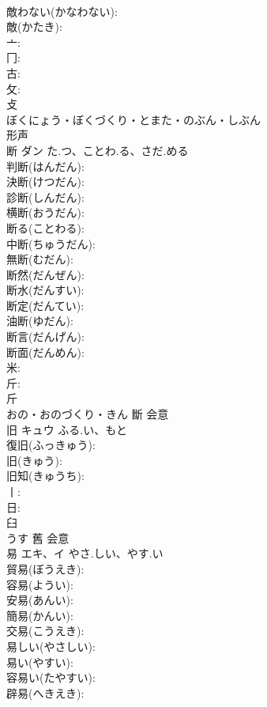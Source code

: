 \documentclass[8pt]{extreport}
\begin{document}
\begin{CJK}{UTF8}{min}
\\	敵わない(かなわない): 
\\	敵(かたき): 
\\	亠: 
\\	冂: 
\\	古: 
\\	攵: 
\\	攴	
\\	ぼくにょう・ぼくづくり・とまた・のぶん・しぶん	
\\	形声 
\\	断	ダン	た.つ、ことわ.る、さだ.める		
\\	判断(はんだん): 
\\	決断(けつだん): 
\\	診断(しんだん): 
\\	横断(おうだん): 
\\	断る(ことわる): 
\\	中断(ちゅうだん): 
\\	無断(むだん): 
\\	断然(だんぜん): 
\\	断水(だんすい): 
\\	断定(だんてい): 
\\	油断(ゆだん): 
\\	断言(だんげん): 
\\	断面(だんめん): 
\\	米: 
\\	斤: 
\\	斤	
\\	おの・おのづくり・きん	斷	会意 
\\	旧	キュウ	ふる.い、もと		
\\	復旧(ふっきゅう): 
\\	旧(きゅう): 
\\	旧知(きゅうち): 
\\	丨: 
\\	日: 
\\	臼	
\\	うす	舊	会意 
\\	易	エキ、イ	やさ.しい、やす.い		
\\	貿易(ぼうえき): 
\\	容易(ようい): 
\\	安易(あんい): 
\\	簡易(かんい): 
\\	交易(こうえき): 
\\	易しい(やさしい): 
\\	易い(やすい): 
\\	容易い(たやすい): 
\\	辟易(へきえき): 

\end{CJK}
\end{document}
